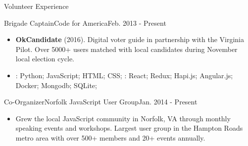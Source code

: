 \documentclass[]{mcdowellcv}
\begin{document}
    \begin{cvsection}{Volunteer Experience}
        \begin{cvsubsection}{Brigade Captain}{Code for America}{Feb. 2013 - Present}
            \begin{itemize}
                \item \textbf{OkCandidate} (2016). Digital voter guide in partnership with the Virginia Pilot. Over 5000+ users matched with local candidates during November local election cycle.
            \end{itemize}
            \begin{itemize}
                 \item {}:  Python; JavaScript; HTML; CSS; \newline
                : React; Redux; Hapi.js; Angular.js; Docker; Mongodb; SQLite;
            \end{itemize}

        \end{cvsubsection}

        \begin{cvsubsection}{Co-Organizer}{Norfolk JavaScript User Group}{Jan. 2014 - Present}
            \begin{itemize}
                \item Grew the local JavaScript community in Norfolk, VA through monthly speaking events and workshops. Largest user group in the Hampton Roads metro area with over 500+ members and 20+ events annually.
            \end{itemize}
        \end{cvsubsection}
    \end{cvsection}
\end{document}
